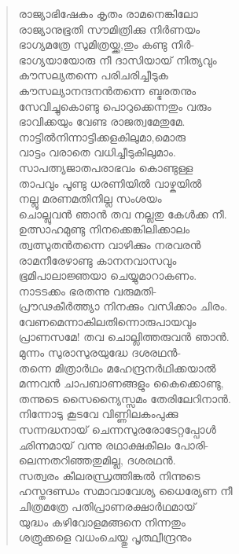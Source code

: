 \begin{verse}
രാജ്യാഭിഷേകം കൃതം രാമനെങ്കിലോ\\
രാജ്യാനുഭൂതി സൗമിത്രിക്കു നിര്‍ണയം\\
ഭാഗ്യമത്രേ സുമിത്രയ്ക്ക,തും കണ്ടു നിര്‍-\\
ഭാഗ്യയായോരു നീ ദാസിയായ് നിത്യവും\\
കൗസല്യതന്നെ പരിചരിച്ചീടുക\\
കൗസല്യാനന്ദനന്‍തന്നെ ബ്ഭരതനും\\
സേവിച്ചുകൊണ്ടു പൊറുക്കെന്നതും വരും\\
ഭാവിക്കയും വേണ്ട രാജത്വമേതുമേ.\\
നാട്ടില്‍നിന്നാട്ടിക്കളകിലുമാ,മൊരു\\
വാട്ടം വരാതെ വധിച്ചീടുകിലുമാം.\\
സാപത്ന്യജാതപരാഭവം കൊണ്ടുള്ള\\
താപവും പൂണ്ടു ധരണിയില്‍ വാഴ്കയില്‍\\
നല്ലൂ മരണമതിനില്ല സംശയം\\
ചൊല്ലുവന്‍ ഞാന്‍ തവ നല്ലതു കേള്‍ക്ക നീ.\\
ഉത്സാഹമുണ്ടു നിനക്കെങ്കിലിക്കാലം\\
ത്വത്സുതന്‍തന്നെ വാഴിക്കും നരവരന്‍\\
രാമനീരേഴാണ്ടു കാനനവാസവും\\
ഭൂമിപാലാജ്ഞയാ ചെയ്യുമാറാകണം.\\
നാടടക്കം ഭരതന്നു വരുമതി-\\
പ്രൗഢകീര്‍ത്ത്യാ നിനക്കും വസിക്കാം ചിരം.\\
വേണമെന്നാകിലതിന്നൊരുപായവും\\
പ്രാണസമേ! തവ ചൊല്ലിത്തരുവന്‍ ഞാന്‍.\\
മുന്നം സുരാസുരയുദ്ധേ ദശരഥന്‍-\\
തന്നെ മിത്രാര്‍ഥം മഹേന്ദ്രനര്‍ഥിക്കയാല്‍\\
മന്നവന്‍ ചാപബാണങ്ങളും കൈക്കൊണ്ടു,\\
തന്നുടെ സൈന്യൈസ്സമം തേരിലേറിനാന്‍.\\
നിന്നോടു കൂടവേ വിണ്ണിലകംപുക്കു\\
സന്നദ്ധനായ് ചെന്നസുരരോടേറ്റപ്പോള്‍\\
ഛിന്നമായ് വന്നു രഥാക്ഷകീലം പോരി-\\
ലെന്നതറിഞ്ഞതുമില്ല, ദശരഥന്‍.\\
സത്വരം കീലരന്ധ്രത്തിങ്കല്‍ നിന്നുടെ\\
ഹസ്തദണ്ഡം സമാവാവേശ്യ ധൈര്യേണ നീ\\
ചിത്രമത്രേ പതിപ്രാണരക്ഷാര്‍ഥമായ്\\
യുദ്ധം കഴിവോളമങ്ങനെ നിന്നതും\\
ശത്രുക്കളെ വധംചെയ്തു പൃത്ഥ്വീന്ദ്രനും\\

\end{verse}
